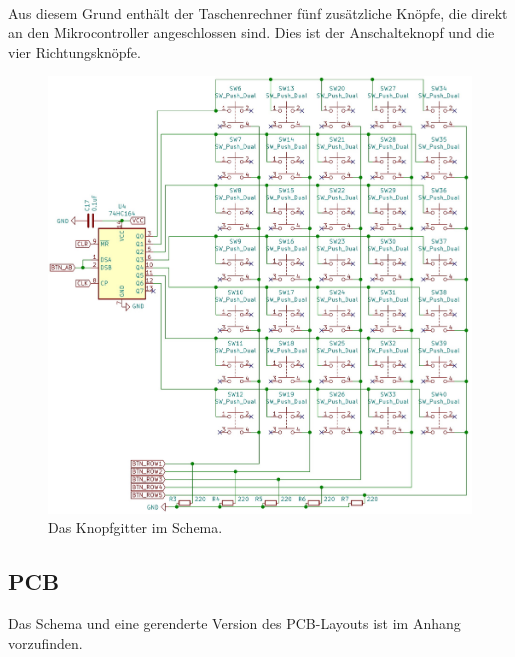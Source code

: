 \documentclass[12pt, a4paper]{report}
\begin{document}
\\[\medskipamount]
Aus diesem Grund enthält der Taschenrechner fünf zusätzliche Knöpfe, die direkt an den Mikrocontroller angeschlossen sind. Dies ist der Anschalteknopf und die vier Richtungsknöpfe.
\begin{figure}[H]
	\centering
	\includegraphics[width=\linewidth]{assets/screenshot_sc_buttons.jpg}
	\caption{Das Knopfgitter im Schema.}
	\label{fig:buttonsgridschematic}
\end{figure}
\subsection{PCB}
Das Schema und eine gerenderte Version des PCB-Layouts ist im Anhang vorzufinden.
\end{document}
